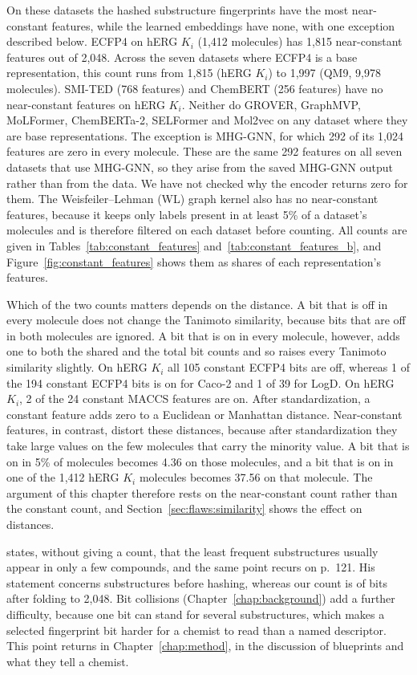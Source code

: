 On these datasets the hashed substructure fingerprints have the most near-constant features, while the learned embeddings have none, with one exception described below. ECFP4 on hERG $K_i$ (1,412 molecules) has 1,815 near-constant features out of 2,048. Across the seven datasets where ECFP4 is a base representation, this count runs from 1,815 (hERG $K_i$) to 1,997 (QM9, 9,978 molecules). SMI-TED (768 features) and ChemBERT (256 features) have no near-constant features on hERG $K_i$. Neither do GROVER, GraphMVP, MoLFormer, ChemBERTa-2, SELFormer and Mol2vec on any dataset where they are base representations. The exception is MHG-GNN, for which 292 of its 1,024 features are zero in every molecule. These are the same 292 features on all seven datasets that use MHG-GNN, so they arise from the saved MHG-GNN output rather than from the data. We have not checked why the encoder returns zero for them. The Weisfeiler--Lehman (WL) graph kernel also has no near-constant features, because it keeps only labels present in at least 5\% of a dataset's molecules and is therefore filtered on each dataset before counting. All counts are given in Tables~\ref{tab:constant_features} and~\ref{tab:constant_features_b}, and Figure~\ref{fig:constant_features} shows them as shares of each representation's features.

Which of the two counts matters depends on the distance. A bit that is off in every molecule does not change the Tanimoto similarity, because bits that are off in both molecules are ignored. A bit that is on in every molecule, however, adds one to both the shared and the total bit counts and so raises every Tanimoto similarity slightly. On hERG $K_i$ all 105 constant ECFP4 bits are off, whereas 1 of the 194 constant ECFP4 bits is on for Caco-2 and 1 of 39 for LogD. On hERG $K_i$, 2 of the 24 constant MACCS features are on. After standardization, a constant feature adds zero to a Euclidean or Manhattan distance. Near-constant features, in contrast, distort these distances, because after standardization they take large values on the few molecules that carry the minority value. A bit that is on in 5\% of molecules becomes 4.36 on those molecules, and a bit that is on in one of the 1,412 hERG $K_i$ molecules becomes 37.56 on that molecule. The argument of this chapter therefore rests on the near-constant count rather than the constant count, and Section~\ref{sec:flaws:similarity} shows the effect on distances.

\citet[p.~112]{Dablander2024} states, without giving a count, that the least frequent substructures usually appear in only a few compounds, and the same point recurs on p.~121. His statement concerns substructures before hashing, whereas our count is of bits after folding to 2,048. Bit collisions (Chapter~\ref{chap:background}) add a further difficulty, because one bit can stand for several substructures, which makes a selected fingerprint bit harder for a chemist to read than a named descriptor. This point returns in Chapter~\ref{chap:method}, in the discussion of blueprints and what they tell a chemist.

